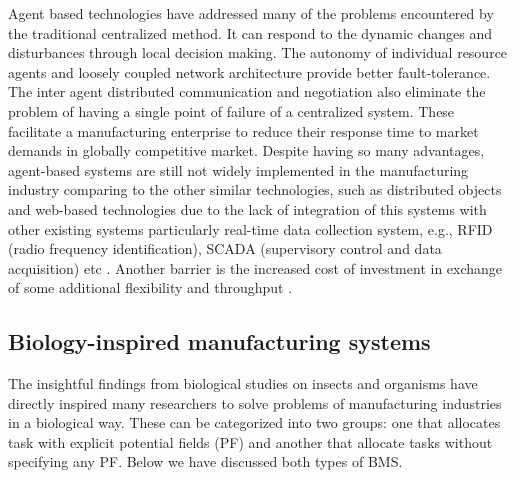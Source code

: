 Agent based technologies have addressed many of the problems encountered by the traditional centralized method. It can respond to the dynamic changes and disturbances through local decision making. The autonomy of individual resource agents and loosely coupled network architecture provide better fault-tolerance. The inter agent distributed communication and negotiation also eliminate the problem of having a single point of failure of a centralized system. These facilitate a manufacturing enterprise to reduce their response time to market demands in globally competitive market. Despite having so many advantages, agent-based systems are still not widely implemented in the manufacturing industry comparing to the other similar technologies, such as distributed objects and web-based technologies due to the lack of integration of this systems with other existing systems particularly real-time data collection system, e.g., RFID (radio frequency identification), SCADA (supervisory control and data acquisition) etc \cite{Shen+2006}. Another barrier is the increased cost of investment in exchange of some additional flexibility and throughput \cite{Schild+2007}. 
%
\subsection{Biology-inspired manufacturing systems}
The insightful findings from biological studies on insects and organisms have directly inspired many researchers to solve problems of manufacturing industries in a biological way. These can be categorized into two groups: one that allocates task with explicit potential fields (PF) and another that allocate tasks without specifying any PF. Below we have discussed both types of BMS.
